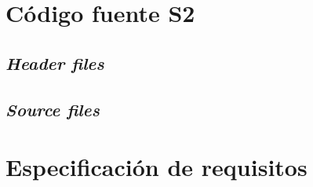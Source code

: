 \chapter{Código fuente S2}
\label{anex:source_code}
\section{\textit{Header files}}












\section{\textit{Source files}}







\chapter{Especificación de requisitos}
\label{anex:requirements}

% 